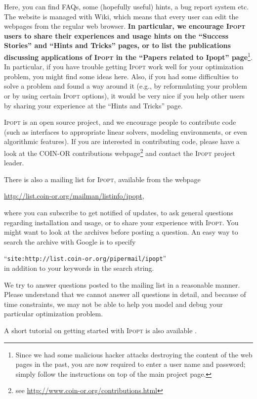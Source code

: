 \documentclass[10pt]{article}
\newcommand{\Ipopt}{\textsc{Ipopt}\xspace}
\begin{document}
Here, you can find FAQs, some (hopefully useful) hints, a bug report
system etc.  The website is managed with Wiki, which means that every
user can edit the webpages from the regular web browser.  {\bf In
  particular, we encourage \Ipopt users to share their experiences
  and usage hints on the ``Success Stories'' and ``Hints and Tricks''
  pages, or to list the publications discussing applications of
  \Ipopt in the ``Papers related to Ipopt'' page}\footnote{Since we
  had some malicious hacker attacks destroying the content of the web
  pages in the past, you are now required to enter a user name and
  password; simply follow the instructions on top of the main project
  page.}.  In particular, if you have trouble getting \Ipopt work
well for your optimization problem, you might find some ideas here.
Also, if you had some difficulties to solve a problem and found a way
around it (e.g., by reformulating your problem or by using certain
\Ipopt options), it would be very nice if you help other users by
sharing your experience at the ``Hints and Tricks'' page.

\Ipopt is an open source project, and we encourage people to
contribute code (such as interfaces to appropriate linear solvers,
modeling environments, or even algorithmic features).  If you are
interested in contributing code, please have a look at the COIN-OR
contributions webpage\footnote{see \url{http://www.coin-or.org/contributions.html}} and contact the \Ipopt
project leader.

There is also a mailing list for \Ipopt, available from the webpage
\begin{center}
\url{http://list.coin-or.org/mailman/listinfo/ipopt},
\end{center}
where you can subscribe to get notified of updates, to ask general
questions regarding installation and usage, or to share your
experience with \Ipopt. You might want to look at the archives before
posting a question.  An easy way to search the archive with Google is
to specify

``\texttt{site:http://list.coin-or.org/pipermail/ipopt}''\\
in addition to your keywords in the search string.

We try to answer questions posted to the mailing list in a reasonable
manner.  Please understand that we cannot answer all questions in
detail, and because of time constraints, we may not be able to help
you model and debug your particular optimization problem.

A short tutorial on getting started with \Ipopt is also available 
\cite{Waechter90Minutes}.
\end{document}
